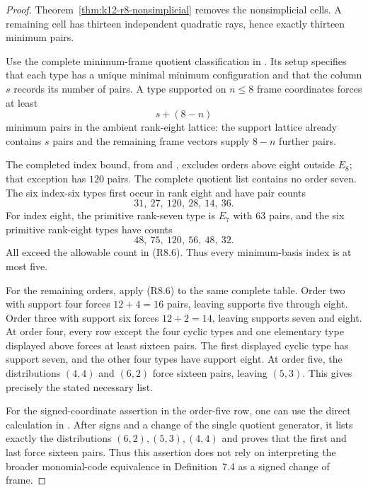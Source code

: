 \documentclass[11pt,a4paper]{article}
\theoremstyle{definition}
\begin{document}
\begin{proof}
Theorem~\ref{thm:k12-r8-nonsimplicial} removes the nonsimplicial
cells. A remaining cell has thirteen independent quadratic rays,
hence exactly thirteen minimum pairs.

Use the complete minimum-frame quotient classification in
\cite[\S11 and Table~11.1, author PDF pp.~45--48]{MartinetIndex2001}.
Its setup specifies that each type has a unique minimal minimum
configuration and that the column $s$ records its number of pairs.
A type supported on $n\leq8$ frame coordinates forces at least
\[
                           s+(8-n)                     \tag{R8.6}
\]
minimum pairs in the ambient rank-eight lattice: the support
lattice already contains $s$ pairs and the remaining frame vectors
supply $8-n$ further pairs.

The completed index bound, from
\cite[appendix]{MartinetIndexErrata2014} and
\cite[Theorem~10.1]{MartinetIndex2001}, excludes orders above eight
outside $E_8$; that exception has $120$ pairs. The complete quotient
list contains no order seven. The six index-six types first occur
in rank eight and have pair counts
\[
                     31,\ 27,\ 120,\ 28,\ 14,\ 36.
\]
For index eight, the primitive rank-seven type is $E_7$ with
$63$ pairs, and the six primitive rank-eight types have counts
\[
                     48,\ 75,\ 120,\ 56,\ 48,\ 32.
\]
All exceed the allowable count in (R8.6). Thus every minimum-basis
index is at most five.

For the remaining orders, apply (R8.6) to the same complete table.
Order two with support four forces $12+4=16$ pairs, leaving
supports five through eight. Order three with support six forces
$12+2=14$, leaving supports seven and eight. At order four, every
row except the four cyclic types and one elementary type displayed
above forces at least sixteen pairs. The first displayed cyclic
type has support seven, and the other four types have support
eight. At order five, the distributions $(4,4)$ and $(6,2)$ force
sixteen pairs, leaving $(5,3)$. This gives precisely the stated
necessary list.

For the signed-coordinate assertion in the order-five row, one can
use the direct calculation in \cite[\S9, case $d=5$, p.~31;
Proposition~9.1 and proof, p.~33]{MartinetIndex2001}.
After signs and a change of the single quotient generator, it lists
exactly the distributions $(6,2),(5,3),(4,4)$ and proves that the
first and last force sixteen pairs. Thus this assertion does not
rely on interpreting the broader monomial-code equivalence in
Definition~7.4 as a signed change of frame.
\end{proof}
\end{document}
